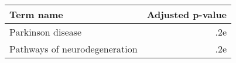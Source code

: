 \begin{tabular}{lr}
\toprule
                    Term name &  Adjusted p-value \\
\midrule
            Parkinson disease &               .2e \\
Pathways of neurodegeneration &               .2e \\
\bottomrule
\end{tabular}
